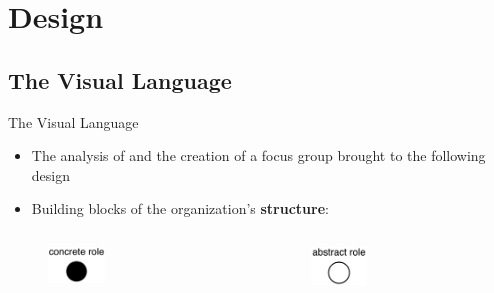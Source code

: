 \section{Design}

\subsection{The Visual Language}
\begin{frame}[allowframebreaks]{The Visual Language}
\begin{itemize}
    \vspace{-0.5cm}
    \item The analysis of \moise{} and the creation of a focus group brought to the following design
    \vspace{0.5cm}
    \item Building blocks of the organization's \textbf{structure}:
\end{itemize}

\begin{columns}
    \begin{column}{0.5\textwidth}
        \begin{figure}
            \centering
            \includegraphics[width=0.35\textwidth]{images/visual-language/concrete-role.png}
        \end{figure}
    \end{column}
    \begin{column}{0.5\textwidth}
        \begin{figure}
            \centering
            \includegraphics[width=0.35\textwidth]{images/visual-language/abstract-role.png}
        \end{figure}
    \end{column}
\end{columns}


\end{frame}
